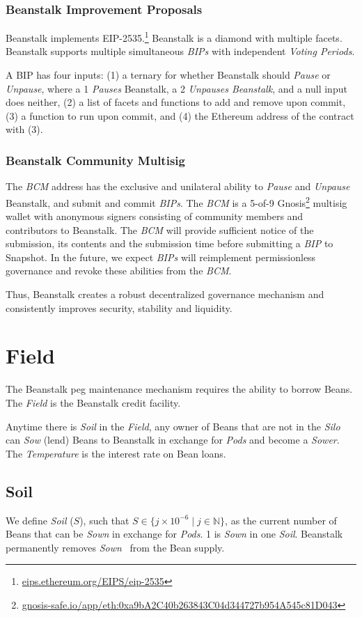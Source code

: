 \documentclass[tikz]{article}
\newcommand{\term}[1]{\textsl{#1}}
\newcommand{\fref}[1]{\footnote{\href{http://#1}{#1}}}
\newcommand{\Bean}{} %
\begin{document}
\subsubsection{Beanstalk Improvement Proposals}
Beanstalk implements EIP-2535.\fref{eips.ethereum.org/EIPS/eip-2535} Beanstalk is a diamond with multiple facets. Beanstalk supports multiple simultaneous \term{BIPs} with independent \term{Voting Periods}.

A BIP has four inputs: (1) a ternary for whether Beanstalk should \term{Pause} or \term{Unpause}, where a 1 \term{Pauses} Beanstalk, a 2 \term{Unpauses Beanstalk}, and a null input does neither, (2) a list of facets and functions to add and remove upon commit, (3) a function to run upon commit, and (4) the Ethereum address of the contract with (3).

\subsubsection{Beanstalk Community Multisig}
The \term{BCM} address has the exclusive and unilateral ability to \term{Pause} and \term{Unpause} Beanstalk, and submit and commit \term{BIPs}. The \term{BCM} is a 5-of-9 Gnosis\fref{gnosis-safe.io/app/eth:0xa9bA2C40b263843C04d344727b954A545c81D043} multisig wallet with anonymous signers consisting of community members and contributors to Beanstalk. The \term{BCM} will provide sufficient notice of the submission, its contents and the submission time before submitting a \term{BIP} to Snapshot. In the future, we expect \term{BIPs} will reimplement permissionless governance and revoke these abilities from the \term{BCM}.

Thus, Beanstalk creates a robust decentralized governance mechanism and consistently improves security, stability and liquidity.

\section{Field}
The Beanstalk peg maintenance mechanism requires the ability to borrow Beans. The \term{Field} is the Beanstalk credit facility. 

Anytime there is \term{Soil} in the \term{Field}, any owner of Beans that are not in the \term{Silo} can \term{Sow} (lend) Beans to Beanstalk in exchange for \term{Pods} and become a \term{Sower}. The \term{Temperature} is the interest rate on Bean loans.

\subsection{Soil}
We define \term{Soil} ($S$), such that $S \in \{j \times 10^{-6} \mid j \in \mathbb{N} \}$, as the current number of Beans that can be \term{Sown} in exchange for \term{Pods}. \Bean1 is \term{Sown} in one \term{Soil}. Beanstalk permanently removes \term{Sown} \Bean\ from the Bean supply. 
\end{document}
